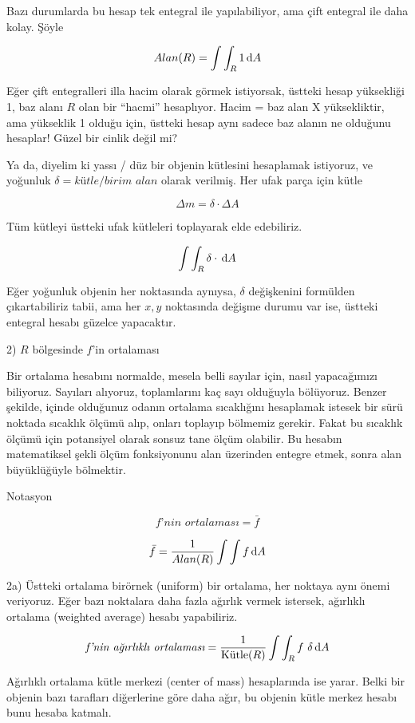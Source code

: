 \documentclass[12pt,fleqn]{article}\usepackage{../../common}
\begin{document}
Bazı durumlarda bu hesap tek entegral ile yapılabiliyor, ama çift entegral ile
daha kolay. Şöyle

$$ Alan(R) = \int \int_R 1 \,\mathrm{d} A $$

Eğer çift entegralleri illa hacim olarak görmek istiyorsak, üstteki hesap
yüksekliği 1, baz alanı $R$ olan bir ``hacmi'' hesaplıyor. Hacim = baz alan
X yüksekliktir, ama yükseklik 1 olduğu için, üstteki hesap aynı sadece baz
alanın ne olduğunu hesaplar! Güzel bir cinlik değil mi?

Ya da, diyelim ki yassı / düz bir objenin kütlesini hesaplamak istiyoruz, ve
yoğunluk $\delta = \textit{kütle} / \textit{birim alan}$ olarak verilmiş. Her
ufak parça için kütle

$$ \Delta m = \delta \cdot \Delta A $$

Tüm kütleyi üstteki ufak kütleleri toplayarak elde edebiliriz. 

$$ \int \int_R \delta \cdot \,\mathrm{d} A $$

Eğer yoğunluk objenin her noktasında aynıysa, $\delta$ değişkenini
formülden çıkartabiliriz tabii, ama her $x,y$ noktasında değişme durumu var
ise, üstteki entegral hesabı güzelce yapacaktır.

2) $R$ bölgesinde $f$'in ortalaması 

Bir ortalama hesabını normalde, mesela belli sayılar için, nasıl
yapacağımızı biliyoruz. Sayıları alıyoruz, toplamlarını kaç sayı olduğuyla
bölüyoruz. Benzer şekilde, içinde olduğunuz odanın ortalama sıcaklığını
hesaplamak istesek bir sürü noktada sıcaklık ölçümü alıp, onları toplayıp
bölmemiz gerekir. Fakat bu sıcaklık ölçümü için potansiyel olarak sonsuz
tane ölçüm olabilir. Bu hesabın matematiksel şekli ölçüm fonksiyonunu alan
üzerinden entegre etmek, sonra alan büyüklüğüyle bölmektir. 

Notasyon

$$ \textit{f'nin ortalaması} = \bar{f} $$

$$ \bar{f} = \frac{1}{Alan(R)} \int \int f \,\mathrm{d} A $$

2a) Üstteki ortalama birörnek (uniform) bir ortalama, her noktaya
aynı önemi veriyoruz. Eğer bazı noktalara daha fazla ağırlık vermek
istersek, ağırlıklı ortalama (weighted average) hesabı yapabiliriz.

$$ 
\textit{f'nin ağırlıklı ortalaması} = \frac{1}{\textrm{Kütle}(R)} 
\int \int_R f \ \delta \,\mathrm{d} A
$$

Ağırlıklı ortalama kütle merkezi (center of mass) hesaplarında ise
yarar. Belki bir objenin bazı tarafları diğerlerine göre daha ağır, bu
objenin kütle merkez hesabı bunu hesaba katmalı. 
\end{document}
